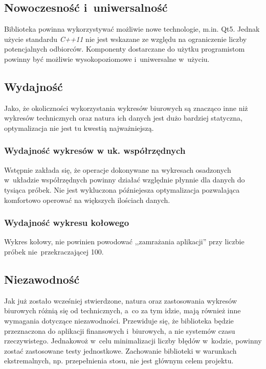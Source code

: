 \documentclass[11pt,twoside,a4paper,final]{article}
\begin{document}
\subsection{Nowoczesność i~uniwersalność}
Biblioteka powinna wykorzystywać możliwie nowe technologie, m.in. Qt5. Jednak użycie standardu \textit{C++11} nie jest wskazane ze względu na ograniczenie liczby potencjalnych odbiorców. Komponenty dostarczane do użytku programistom powinny być możliwie wysokopoziomowe i~uniwersalne w~użyciu.

\subsection{Wydajność}
Jako, że okoliczności wykorzystania wykresów biurowych są znacząco inne niż wykresów technicznych oraz natura ich danych jest dużo bardziej statyczna, optymalizacja nie jest tu kwestią najważniejszą. 

\subsubsection{Wydajność wykresów w uk. współrzędnych}
Wstępnie zakłada się, że operacje dokonywane na wykresach osadzonych w~układzie współrzędnych powinny działać względnie płynnie dla danych do tysiąca próbek. Nie jest wykluczona późniejesza optymalizacja
pozwalająca komfortowo operować na większych ilościach danych.

\subsubsection{Wydajność wykresu kołowego}
Wykres kołowy, nie powinien powodować ,,zamrażania aplikacji'' przy liczbie próbek nie~przekraczającej 100. 

\subsection{Niezawodność}
Jak już zostało wcześniej stwierdzone, natura oraz zastosowania wykresów biurowych różnią się od technicznych, a~co za tym idzie, mają również inne wymagania dotyczące niezawodności. Przewiduje się, że biblioteka będzie przeznaczona do aplikacji finansowych i~biurowych, a nie systemów czasu rzeczywistego. Jednakowoż w~celu minimalizacji liczby błędów w~kodzie, powinny zostać zastosowane testy jednostkowe. Zachowanie biblioteki w warunkach ekstremalnych, np. przepełnienia stosu, nie jest głównym celem projektu.

\end{document}

